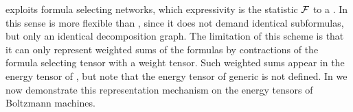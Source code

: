 \subsect{\SelectionSparsity{}}\label{sec:selectionSparsityHLN}

\SelectionSparsity{} exploits formula selecting networks, which expressivity is the statistic $\mathcal{F}$ to a \HybridLogicNetwork{}.
In this sense \selectionSparsity{} is more flexible than \DecompositionSparsity{}, since it does not demand identical subformulas, but only an identical decomposition graph.
The limitation of this scheme is that it can only represent weighted sums of the formulas by contractions of the formula selecting tensor with a weight tensor.
Such weighted sums appear in the energy tensor of \MarkovLogicNetworks{}, but note that the energy tensor of generic \HybridLogicNetworks{} is not defined.
In  we now demonstrate this representation mechanism on the energy tensors of Boltzmann machines.

